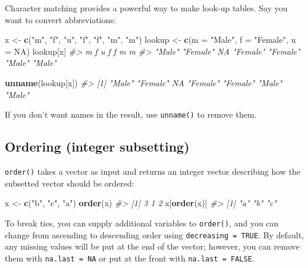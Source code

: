 \documentclass[]{book}
\newenvironment{Shaded}{\begin{snugshade}}{\end{snugshade}}
\newcommand{\CommentTok}[1]{\textcolor[rgb]{0.56,0.35,0.01}{\textit{#1}}}
\newcommand{\DataTypeTok}[1]{\textcolor[rgb]{0.13,0.29,0.53}{#1}}
\newcommand{\KeywordTok}[1]{\textcolor[rgb]{0.13,0.29,0.53}{\textbf{#1}}}
\newcommand{\NormalTok}[1]{#1}
\newcommand{\OtherTok}[1]{\textcolor[rgb]{0.56,0.35,0.01}{#1}}
\newcommand{\StringTok}[1]{\textcolor[rgb]{0.31,0.60,0.02}{#1}}
\theoremstyle{definition}
\theoremstyle{definition}
\theoremstyle{definition}
\theoremstyle{remark}
\begin{document}
Character matching provides a powerful way to make look-up tables. Say
you want to convert abbreviations:

\begin{Shaded}
\begin{Highlighting}[]
\NormalTok{x <-}\StringTok{ }\KeywordTok{c}\NormalTok{(}\StringTok{"m"}\NormalTok{, }\StringTok{"f"}\NormalTok{, }\StringTok{"u"}\NormalTok{, }\StringTok{"f"}\NormalTok{, }\StringTok{"f"}\NormalTok{, }\StringTok{"m"}\NormalTok{, }\StringTok{"m"}\NormalTok{)}
\NormalTok{lookup <-}\StringTok{ }\KeywordTok{c}\NormalTok{(}\DataTypeTok{m =} \StringTok{"Male"}\NormalTok{, }\DataTypeTok{f =} \StringTok{"Female"}\NormalTok{, }\DataTypeTok{u =} \OtherTok{NA}\NormalTok{)}
\NormalTok{lookup[x]}
\CommentTok{#>        m        f        u        f        f        m        m }
\CommentTok{#>   "Male" "Female"       NA "Female" "Female"   "Male"   "Male"}

\KeywordTok{unname}\NormalTok{(lookup[x])}
\CommentTok{#> [1] "Male"   "Female" NA       "Female" "Female" "Male"   "Male"}
\end{Highlighting}
\end{Shaded}

If you don't want names in the result, use \texttt{unname()} to remove
them.

\hypertarget{ordering-integer-subsetting}{%
\subsection{Ordering (integer
subsetting)}\label{ordering-integer-subsetting}}

\texttt{order()} takes a vector as input and returns an integer vector
describing how the subsetted vector should be ordered:

\begin{Shaded}
\begin{Highlighting}[]
\NormalTok{x <-}\StringTok{ }\KeywordTok{c}\NormalTok{(}\StringTok{"b"}\NormalTok{, }\StringTok{"c"}\NormalTok{, }\StringTok{"a"}\NormalTok{)}
\KeywordTok{order}\NormalTok{(x)}
\CommentTok{#> [1] 3 1 2}
\NormalTok{x[}\KeywordTok{order}\NormalTok{(x)]}
\CommentTok{#> [1] "a" "b" "c"}
\end{Highlighting}
\end{Shaded}

To break ties, you can supply additional variables to \texttt{order()},
and you can change from ascending to descending order using
\texttt{decreasing\ =\ TRUE}. By default, any missing values will be put
at the end of the vector; however, you can remove them with
\texttt{na.last\ =\ NA} or put at the front with
\texttt{na.last\ =\ FALSE}.
\end{document}
